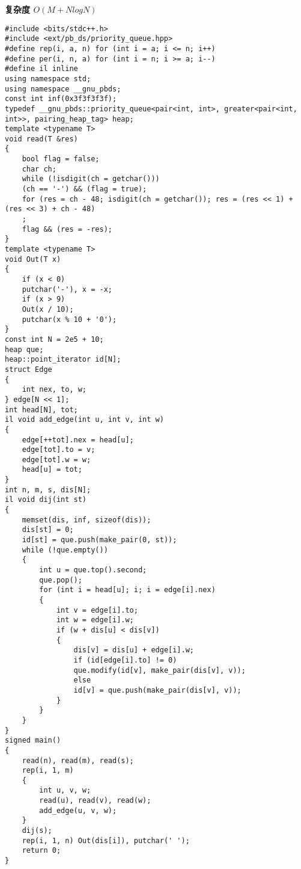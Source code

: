 \documentclass[E:/GsjzTle/main/main.tex]{subfiles}
\begin{document}
\textbf{复杂度 \(O(M+NlogN)\)}

\begin{lstlisting}
#include <bits/stdc++.h>
#include <ext/pb_ds/priority_queue.hpp>
#define rep(i, a, n) for (int i = a; i <= n; i++)
#define per(i, n, a) for (int i = n; i >= a; i--)
#define il inline
using namespace std;
using namespace __gnu_pbds;
const int inf(0x3f3f3f3f);
typedef __gnu_pbds::priority_queue<pair<int, int>, greater<pair<int, int>>, pairing_heap_tag> heap;
template <typename T>
void read(T &res)
{
	bool flag = false;
	char ch;
	while (!isdigit(ch = getchar()))
	(ch == '-') && (flag = true);
	for (res = ch - 48; isdigit(ch = getchar()); res = (res << 1) + (res << 3) + ch - 48)
	;
	flag && (res = -res);
}
template <typename T>
void Out(T x)
{
	if (x < 0)
	putchar('-'), x = -x;
	if (x > 9)
	Out(x / 10);
	putchar(x % 10 + '0');
}
const int N = 2e5 + 10;
heap que;
heap::point_iterator id[N];
struct Edge
{
	int nex, to, w;
} edge[N << 1];
int head[N], tot;
il void add_edge(int u, int v, int w)
{
	edge[++tot].nex = head[u];
	edge[tot].to = v;
	edge[tot].w = w;
	head[u] = tot;
}
int n, m, s, dis[N];
il void dij(int st)
{
	memset(dis, inf, sizeof(dis));
	dis[st] = 0;
	id[st] = que.push(make_pair(0, st));
	while (!que.empty())
	{
		int u = que.top().second;
		que.pop();
		for (int i = head[u]; i; i = edge[i].nex)
		{
			int v = edge[i].to;
			int w = edge[i].w;
			if (w + dis[u] < dis[v])
			{
				dis[v] = dis[u] + edge[i].w;
				if (id[edge[i].to] != 0)
				que.modify(id[v], make_pair(dis[v], v));
				else
				id[v] = que.push(make_pair(dis[v], v));
			}
		}
	}
}
signed main()
{
	read(n), read(m), read(s);
	rep(i, 1, m)
	{
		int u, v, w;
		read(u), read(v), read(w);
		add_edge(u, v, w);
	}
	dij(s);
	rep(i, 1, n) Out(dis[i]), putchar(' ');
	return 0;
}
\end{lstlisting}
\end{document}
